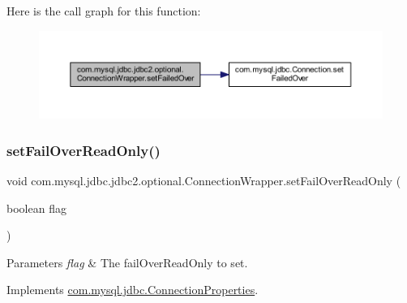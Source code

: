Here is the call graph for this function\+:
\nopagebreak
\begin{figure}[H]
\begin{center}
\leavevmode
\includegraphics[width=350pt]{classcom_1_1mysql_1_1jdbc_1_1jdbc2_1_1optional_1_1_connection_wrapper_a5ca644a1dbabdfa779153552d47fc826_cgraph}
\end{center}
\end{figure}
\mbox{\label{classcom_1_1mysql_1_1jdbc_1_1jdbc2_1_1optional_1_1_connection_wrapper_a23b3e7be6b29af8786a6641fec4196aa}} 
\subsubsection{\texorpdfstring{set\+Fail\+Over\+Read\+Only()}{setFailOverReadOnly()}}
{\footnotesize\ttfamily void com.\+mysql.\+jdbc.\+jdbc2.\+optional.\+Connection\+Wrapper.\+set\+Fail\+Over\+Read\+Only (\begin{DoxyParamCaption}\item[{boolean}]{flag }\end{DoxyParamCaption})}


\begin{DoxyParams}{Parameters}
{\em flag} & The fail\+Over\+Read\+Only to set. \\
\hline
\end{DoxyParams}


Implements \mbox{\hyperlink{interfacecom_1_1mysql_1_1jdbc_1_1_connection_properties_acc1561f34ff6aaa02a3a6c0e6184644f}{com.\+mysql.\+jdbc.\+Connection\+Properties}}.

